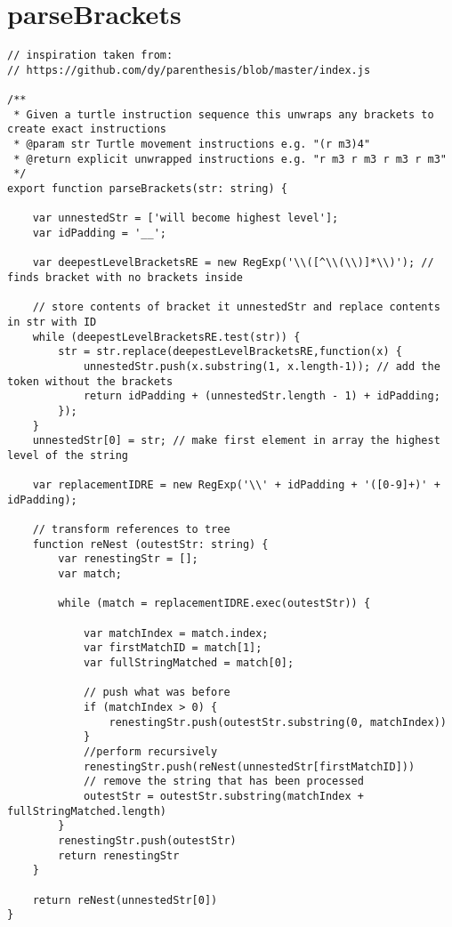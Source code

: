 \documentclass[12pt,a4paper,anyside,openright]{report}
\begin{document}
\section{parseBrackets}
\label{appendix:parseBrackets}
\begin{lstlisting}[style=js]
// inspiration taken from:
// https://github.com/dy/parenthesis/blob/master/index.js

/**
 * Given a turtle instruction sequence this unwraps any brackets to create exact instructions
 * @param str Turtle movement instructions e.g. "(r m3)4"
 * @return explicit unwrapped instructions e.g. "r m3 r m3 r m3 r m3"
 */
export function parseBrackets(str: string) {

	var unnestedStr = ['will become highest level'];
	var idPadding = '__';

	var deepestLevelBracketsRE = new RegExp('\\([^\\(\\)]*\\)'); // finds bracket with no brackets inside

	// store contents of bracket it unnestedStr and replace contents in str with ID
	while (deepestLevelBracketsRE.test(str)) {
		str = str.replace(deepestLevelBracketsRE,function(x) {
			unnestedStr.push(x.substring(1, x.length-1)); // add the token without the brackets
			return idPadding + (unnestedStr.length - 1) + idPadding;
		});
	}
	unnestedStr[0] = str; // make first element in array the highest level of the string

	var replacementIDRE = new RegExp('\\' + idPadding + '([0-9]+)' + idPadding);

	// transform references to tree
	function reNest (outestStr: string) {
		var renestingStr = [];
		var match;

		while (match = replacementIDRE.exec(outestStr)) {

			var matchIndex = match.index;
			var firstMatchID = match[1];
			var fullStringMatched = match[0];

			// push what was before
			if (matchIndex > 0) {
				renestingStr.push(outestStr.substring(0, matchIndex))
			}
			//perform recursively
			renestingStr.push(reNest(unnestedStr[firstMatchID]))
			// remove the string that has been processed
			outestStr = outestStr.substring(matchIndex + fullStringMatched.length)
		}
		renestingStr.push(outestStr)
		return renestingStr
	}

	return reNest(unnestedStr[0])
}
\end{lstlisting}
\end{document}
